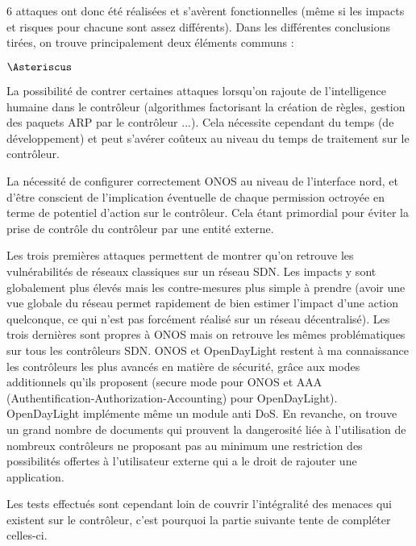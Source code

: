 6 attaques ont donc été réalisées et s'avèrent fonctionnelles (même si les impacts et risques pour chacune sont assez différents). Dans les différentes conclusions tirées, on trouve principalement deux éléments communs :

\begin{list}{$\Asteriscus$}{}

\item La possibilité de contrer certaines attaques lorsqu'on rajoute de l'intelligence humaine dans le contrôleur (algorithmes factorisant la création de règles, gestion des paquets ARP par le contrôleur ...). Cela nécessite cependant du temps (de développement) et peut s'avérer coûteux au niveau du temps de traitement sur le contrôleur.

\item La nécessité de configurer correctement ONOS au niveau de l'interface nord, et d'être conscient de l'implication éventuelle de chaque permission octroyée en terme de potentiel d'action sur le contrôleur. Cela étant primordial pour éviter la prise de contrôle du contrôleur par une entité externe.

\end{list}

Les trois premières attaques permettent de montrer qu'on retrouve les vulnérabilités de réseaux classiques sur un réseau SDN. Les impacts y sont globalement plus élevés mais les contre-mesures plus simple à prendre (avoir une vue globale du réseau permet rapidement de bien estimer l'impact d'une action quelconque, ce qui n'est pas forcément réalisé sur un réseau décentralisé).
Les trois dernières sont propres à ONOS mais on retrouve les mêmes problématiques sur tous les contrôleurs SDN. ONOS et OpenDayLight restent à ma connaissance les contrôleurs les plus avancés en matière de sécurité, grâce aux modes additionnels qu'ils proposent (secure mode pour ONOS et AAA (Authentification-Authorization-Accounting) pour OpenDayLight). OpenDayLight implémente même un module anti DoS. En revanche, on trouve un grand nombre de documents qui prouvent la dangerosité liée à l'utilisation de nombreux contrôleurs ne proposant pas au minimum une restriction des possibilités offertes à l'utilisateur externe qui a le droit de rajouter une application.

Les tests effectués sont cependant loin de couvrir l'intégralité des menaces qui existent sur le contrôleur, c'est pourquoi la partie suivante tente de compléter celles-ci.

